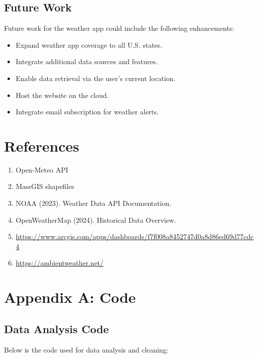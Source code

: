 \documentclass[a4paper, 12pt]{article}
\begin{document}
\subsection{Future Work}
\label{sec:future-work}
Future work for the weather app could include the following enhancements:
\begin{itemize}
    \item Expand weather app coverage to all U.S. states.
    \item Integrate additional data sources and features.
    \item Enable data retrieval via the user’s current location.
    \item Host the website on the cloud.
    \item Integrate email subscription for weather alerts.
\end{itemize}



\section{References}
\label{sec:references}

\begin{enumerate}
    \item Open-Meteo API
    \item MassGIS shapefiles
    \item NOAA (2023). Weather Data API Documentation.
    \item OpenWeatherMap (2024). Historical Data Overview.
    \item \url{https://www.arcgis.com/apps/dashboards/f7f008a8452747d0a8d86ed69d77cdc4}
    \item \url{https://ambientweather.net/}
\end{enumerate}





\appendix
\section{Appendix A: Code}
\label{sec:appendix-a}

\subsection{Data Analysis Code}
\label{sec:appendix-a1}

Below is the code used for data analysis and cleaning:
\end{document}

